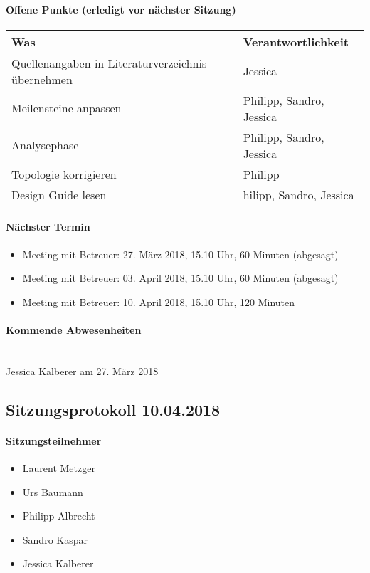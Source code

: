 \paragraph{Offene Punkte (erledigt vor nächster Sitzung)} \mbox{}

\begin{table}[H]
	\centering
	\begin{tabularx}{\textwidth}{X | p{4.5cm}}
		\rowcolor{gray!50}
		\textbf{Was} & \textbf{Verantwortlichkeit} \\
		\hline
		Quellenangaben in Literaturverzeichnis übernehmen & Jessica \\
		Meilensteine anpassen & Philipp, Sandro, Jessica \\
		Analysephase & 	Philipp, Sandro, Jessica \\
		Topologie korrigieren & Philipp \\
		Design Guide lesen & hilipp, Sandro, Jessica \\
	\end{tabularx}
	\label{tab:my-label}
\end{table}

\paragraph{Nächster Termin}
\begin{itemize}	
	\item Meeting mit Betreuer: 27. März 2018, 15.10 Uhr, 60 Minuten (abgesagt)
	\item Meeting mit Betreuer: 03. April 2018, 15.10 Uhr, 60 Minuten (abgesagt)
	\item Meeting mit Betreuer: 10. April 2018, 15.10 Uhr, 120 Minuten
\end{itemize}

\paragraph{Kommende Abwesenheiten} \mbox{}\\
Jessica Kalberer am 27. März 2018
\newpage





\subsection{Sitzungsprotokoll 10.04.2018}

\paragraph{Sitzungsteilnehmer}
\begin{itemize}	
	\item Laurent Metzger 
	\item Urs Baumann
	\item Philipp Albrecht
	\item Sandro Kaspar
	\item Jessica Kalberer
\end{itemize}

